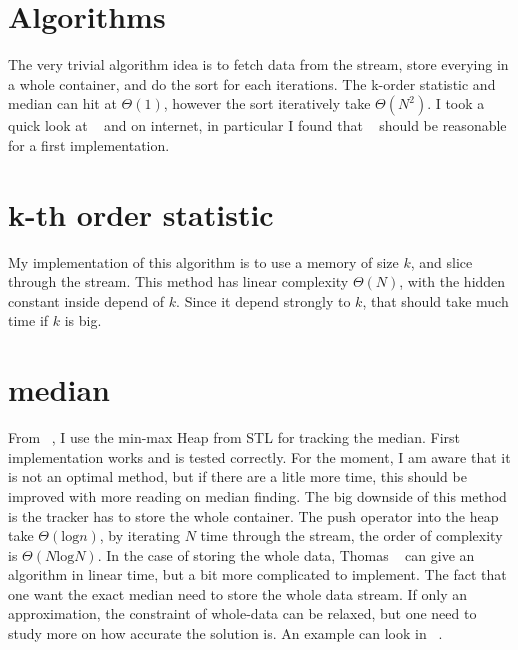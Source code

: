 \documentclass[a4paper,10pt]{article}
\begin{document}
\section{Algorithms}
The very trivial algorithm idea is to fetch data from the stream, store everying in a whole container, and do the sort for each iterations. The k-order statistic and median can hit at $\Theta(1)$, however the sort iteratively take $\Theta(N^2)$. I took a quick look at ~\cite{THOMAS} and on internet, in particular I found that ~\cite{STACKOVERFLOW} should be reasonable for a first implementation. 
\section{k-th order statistic}
My implementation of this algorithm is to use a memory of size $k$, and slice through the stream. This method has linear complexity $\Theta(N)$, with the hidden constant inside depend of $k$. Since it depend strongly to $k$, that should take much time if $k$ is big.
\section{median}
From ~\cite{STACKOVERFLOW}, I use the min-max Heap from STL for tracking the median. First implementation works and is tested correctly. For the moment, I am aware that it is not an optimal method, but if there are a litle more time, this should be improved with more reading on median finding. The big downside of this method is the tracker has to store the whole container. The push operator into the heap take $\Theta(\text{log}n)$, by iterating $N$ time through the stream, the order of complexity is $\Theta(N\text{log}N)$. In the case of storing the whole data, Thomas ~\cite{THOMAS} can give an algorithm in linear time, but a bit more complicated to implement. The fact that one want the exact median need to store the whole data stream. If only an approximation, the constraint of whole-data can be relaxed, but one need to study more on how accurate the solution is. An example can look in  ~\cite{PETER1990}. 
\end{document}
